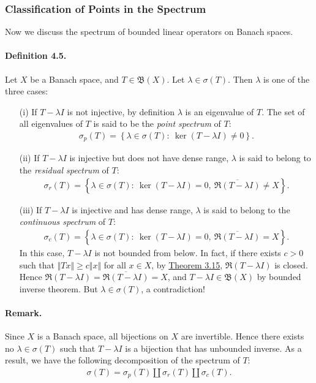 \documentclass{article}
\begin{document}
\subsubsection{Classification of Points in the Spectrum}
Now we discuss the spectrum of bounded linear operators on Banach spaces.
\paragraph{Definition 4.5.\label{def:4.5}} Let $X$ be a Banach space, and $T\in\mathfrak{B}(X)$. Let $\lambda\in\sigma(T)$. Then $\lambda$ is one of the three cases:
\begin{itemize}
\vspace{0.1cm}
\item[(i)] If $T - \lambda I$ is not injective, by definition $\lambda$ is an eigenvalue of $T$. The set of all eigenvalues of $T$ is said to be the \textit{point spectrum} of $T$:
\begin{align*}
	\sigma_p(T) = \left\{\lambda\in\sigma(T):\ \ker(T-\lambda I)\neq 0\right\}.
\end{align*}
\item[(ii)]  If $T-\lambda I$ is injective but does not have dense range, $\lambda$ is said to belong to the \textit{residual spectrum} of $T$:
\begin{align*}
	\sigma_r(T) = \left\{\lambda\in\sigma(T):\ \ker(T-\lambda I)=0,\ \overline{\mathfrak{R}(T-\lambda I)}\neq X\right\}.
\end{align*}
\item[(iii)]  If $T-\lambda I$ is injective and has dense range, $\lambda$ is said to belong to the \textit{continuous spectrum} of $T$:
\begin{align*}
	\sigma_c(T) = \left\{\lambda\in\sigma(T):\ \ker(T-\lambda I)=0,\ \overline{\mathfrak{R}(T-\lambda I)}= X\right\}.
\end{align*}
In this case, $T-\lambda I$ is not bounded from below. In fact, if there exists $c>0$ such that $\Vert Tx\Vert\geq c\Vert x\Vert$ for all $x\in X$, by \hyperref[thm:3.15]{Theorem 3.15}, $\mathfrak{R}(T-\lambda I)$ is closed. Hence $\mathfrak{R}(T-\lambda I) = \overline{\mathfrak{R}(T-\lambda I)}=X$, and $T-\lambda I\in\mathfrak{B}(X)$ by bounded inverse theorem. But $\lambda\in\sigma(T)$, a contradiction!
\end{itemize}
\paragraph{Remark.}  Since $X$ is a Banach space, all bijections on $X$ are invertible. Hence there exists no $\lambda\in\sigma(T)$ such that $T-\lambda I$ is a bijection that has unbounded inverse. As a result, we have the following decomposition of the spectrum of $T$:
\begin{align*}
	\sigma(T) = \sigma_p(T)\amalg\sigma_r(T)\amalg\sigma_c(T).
\end{align*}
\end{document}
